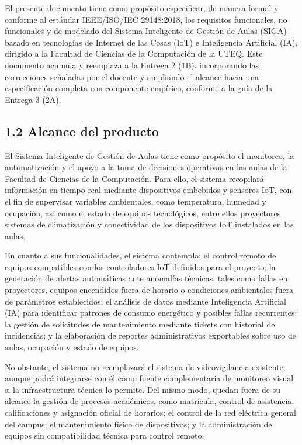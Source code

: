 
El presente documento tiene como propósito especificar, de manera formal y conforme al estándar IEEE/ISO/IEC 29148:2018, los requisitos funcionales, no funcionales y de modelado del Sistema Inteligente de Gestión de Aulas (SIGA) basado en tecnologías de Internet de las Cosas (IoT) e Inteligencia Artificial (IA), dirigido a la Facultad de Ciencias de la Computación de la UTEQ. Este documento acumula y reemplaza a la Entrega 2 (1B), incorporando las correcciones señaladas por el docente y ampliando el alcance hacia una especificación completa con componente empírico, conforme a la guía de la Entrega 3 (2A).


\subsection*{1.2 Alcance del producto}


El Sistema Inteligente de Gestión de Aulas tiene como propósito el monitoreo, la automatización y el apoyo a la toma de decisiones operativas en las aulas de la Facultad de Ciencias de la Computación. Para ello, el sistema recopilará información en tiempo real mediante dispositivos embebidos y sensores IoT, con el fin de supervisar variables ambientales, como temperatura, humedad y ocupación, así como el estado de equipos tecnológicos, entre ellos proyectores, sistemas de climatización y conectividad de los dispositivos IoT instalados en las aulas.


En cuanto a sus funcionalidades, el sistema contempla: el control remoto de equipos compatibles con los controladores IoT definidos para el proyecto; la generación de alertas automáticas ante anomalías técnicas, tales como fallas en proyectores, equipos encendidos fuera de horario o condiciones ambientales fuera de parámetros establecidos; el análisis de datos mediante Inteligencia Artificial (IA) para identificar patrones de consumo energético y posibles fallas recurrentes; la gestión de solicitudes de mantenimiento mediante tickets con historial de incidencias; y la elaboración de reportes administrativos exportables sobre uso de aulas, ocupación y estado de equipos.


No obstante, el sistema no reemplazará el sistema de videovigilancia existente, aunque podrá integrarse con él como fuente complementaria de monitoreo visual si la infraestructura técnica lo permite. Del mismo modo, quedan fuera de su alcance la gestión de procesos académicos, como matrícula, control de asistencia, calificaciones y asignación oficial de horarios; el control de la red eléctrica general del campus; el mantenimiento físico de dispositivos; y la administración de equipos sin compatibilidad técnica para control remoto.


